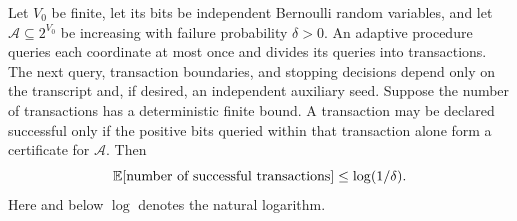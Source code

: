 \begin{lemma}\label{lem:transactions}
Let $V_0$ be finite, let its bits be independent Bernoulli random
variables, and let $\mathcal A\subseteq2^{V_0}$ be increasing with failure
probability $\delta>0$. An adaptive procedure queries each coordinate at
most once and divides its queries into transactions. The next query,
transaction boundaries, and stopping decisions depend only on the
transcript and, if desired, an independent auxiliary seed. Suppose the
number of transactions has a deterministic finite bound. A transaction
may be declared successful only if the positive bits queried within that
transaction alone form a certificate for $\mathcal A$. Then
\begin{equation}\label{eq:certificate-budget}
 \mathbb E[\text{number of successful transactions}]
       \le\log(1/\delta).
\end{equation}
Here and below $\log$ denotes the natural logarithm.
\end{lemma}
